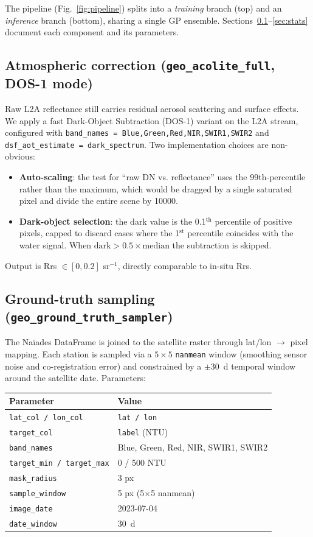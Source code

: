 \documentclass[11pt,a4paper]{article}
\begin{document}
The pipeline (Fig.~\ref{fig:pipeline}) splits into a \emph{training} branch (top) and an \emph{inference} branch (bottom), sharing a single GP ensemble. Sections~\ref{sec:atmcorr}--\ref{sec:stats} document each component and its parameters.

\subsection{Atmospheric correction (\texttt{geo\_acolite\_full}, DOS-1 mode)}
\label{sec:atmcorr}
Raw L2A reflectance still carries residual aerosol scattering and surface effects. We apply a fast Dark-Object Subtraction (DOS-1) variant on the L2A stream, configured with \texttt{band\_names = Blue,Green,Red,NIR,SWIR1,SWIR2} and \texttt{dsf\_aot\_estimate = dark\_spectrum}. Two implementation choices are non-obvious:
\begin{itemize}
    \item \textbf{Auto-scaling}: the test for ``raw DN vs. reflectance'' uses the 99th-percentile rather than the maximum, which would be dragged by a single saturated pixel and divide the entire scene by \num{10000}.
    \item \textbf{Dark-object selection}: the dark value is the 0.1$^{\text{th}}$ percentile of positive pixels, capped to discard cases where the 1$^{\text{st}}$ percentile coincides with the water signal. When $\textrm{dark} > 0.5 \times \textrm{median}$ the subtraction is skipped.
\end{itemize}
Output is Rrs $\in [0, 0.2]$ sr$^{-1}$, directly comparable to in-situ Rrs.

\subsection{Ground-truth sampling (\texttt{geo\_ground\_truth\_sampler})}
\label{sec:gtsamp}
The Naïades DataFrame is joined to the satellite raster through lat/lon $\to$ pixel mapping. Each station is sampled via a $5\times5$ \texttt{nanmean} window (smoothing sensor noise and co-registration error) and constrained by a $\pm$\SI{30}{\day} temporal window around the satellite date. Parameters:

\begin{center}
\small
\begin{tabular}{ll}
\toprule
Parameter & Value \\
\midrule
\texttt{lat\_col / lon\_col} & \texttt{lat / lon} \\
\texttt{target\_col} & \texttt{label} (NTU) \\
\texttt{band\_names} & Blue, Green, Red, NIR, SWIR1, SWIR2 \\
\texttt{target\_min / target\_max} & 0 / 500 NTU \\
\texttt{mask\_radius} & 3 px \\
\texttt{sample\_window} & 5 px (5$\times$5 nanmean) \\
\texttt{image\_date} & 2023-07-04 \\
\texttt{date\_window} & \SI{30}{\day} \\
\bottomrule
\end{tabular}
\end{center}
\end{document}
